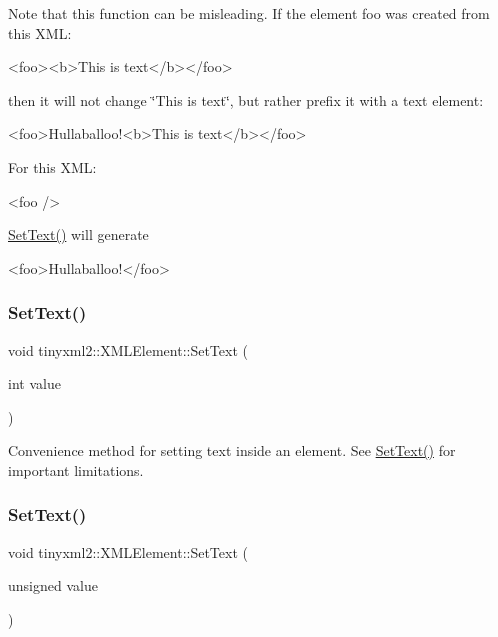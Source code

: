 Note that this function can be misleading. If the element foo was created from this X\+ML\+: \begin{DoxyVerb}<foo><b>This is text</b></foo>
\end{DoxyVerb}


then it will not change \char`\"{}\+This is text\char`\"{}, but rather prefix it with a text element\+: \begin{DoxyVerb}<foo>Hullaballoo!<b>This is text</b></foo>
\end{DoxyVerb}


For this X\+ML\+: \begin{DoxyVerb}<foo />
\end{DoxyVerb}
 \hyperlink{classtinyxml2_1_1_x_m_l_element_a1f9c2cd61b72af5ae708d37b7ad283ce}{Set\+Text()} will generate \begin{DoxyVerb}<foo>Hullaballoo!</foo>
\end{DoxyVerb}
 \mbox{\label{classtinyxml2_1_1_x_m_l_element_aeae8917b5ea6060b3c08d4e3d8d632d7}} 
\subsubsection{\texorpdfstring{Set\+Text()}{SetText()}\hspace{0.1cm}{\footnotesize\ttfamily [2/7]}}
{\footnotesize\ttfamily void tinyxml2\+::\+X\+M\+L\+Element\+::\+Set\+Text (\begin{DoxyParamCaption}\item[{int}]{value }\end{DoxyParamCaption})}



Convenience method for setting text inside an element. See \hyperlink{classtinyxml2_1_1_x_m_l_element_a1f9c2cd61b72af5ae708d37b7ad283ce}{Set\+Text()} for important limitations. 

\mbox{\label{classtinyxml2_1_1_x_m_l_element_a7bbfcc11d516598bc924a8fba4d08597}} 
\subsubsection{\texorpdfstring{Set\+Text()}{SetText()}\hspace{0.1cm}{\footnotesize\ttfamily [3/7]}}
{\footnotesize\ttfamily void tinyxml2\+::\+X\+M\+L\+Element\+::\+Set\+Text (\begin{DoxyParamCaption}\item[{unsigned}]{value }\end{DoxyParamCaption})}



